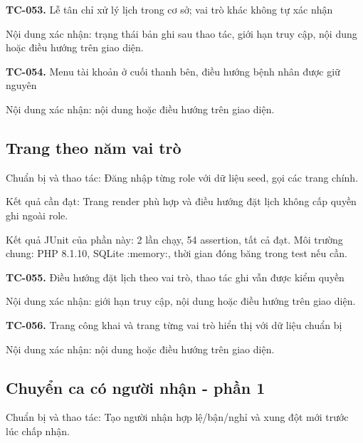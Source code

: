 \noindent\textbf{TC-053.} Lễ tân chỉ xử lý lịch trong cơ sở; vai trò khác không tự xác nhận\par
Nội dung xác nhận:\allowbreak{} trạng thái bản ghi sau thao tác, giới hạn truy cập, nội dung hoặc điều hướng trên giao diện.\allowbreak{}

\noindent\textbf{TC-054.} Menu tài khoản ở cuối thanh bên, điều hướng bệnh nhân được giữ nguyên\par
Nội dung xác nhận:\allowbreak{} nội dung hoặc điều hướng trên giao diện.\allowbreak{}


\par\vspace{8pt}

\subsection{Trang theo năm vai trò}
Chuẩn bị và thao tác:\allowbreak{} Đăng nhập từng role với dữ liệu seed, gọi các trang chính.\allowbreak{}

Kết quả cần đạt:\allowbreak{} Trang render phù hợp và điều hướng đặt lịch không cấp quyền ghi ngoài role.\allowbreak{}

Kết quả JUnit của phần này:\allowbreak{} 2 lần chạy, 54 assertion, tất cả đạt.\allowbreak{} Môi trường chung:\allowbreak{} PHP 8.\allowbreak{}1.\allowbreak{}10, SQLite :\allowbreak{}memory:\allowbreak{}, thời gian đóng băng trong test nếu cần.\allowbreak{}

\noindent\textbf{TC-055.} Điều hướng đặt lịch theo vai trò, thao tác ghi vẫn được kiểm quyền\par
Nội dung xác nhận:\allowbreak{} giới hạn truy cập, nội dung hoặc điều hướng trên giao diện.\allowbreak{}

\noindent\textbf{TC-056.} Trang công khai và trang từng vai trò hiển thị với dữ liệu chuẩn bị\par
Nội dung xác nhận:\allowbreak{} nội dung hoặc điều hướng trên giao diện.\allowbreak{}


\par\vspace{8pt}

\subsection{Chuyển ca có người nhận - phần 1}
Chuẩn bị và thao tác:\allowbreak{} Tạo người nhận hợp lệ/\allowbreak{}bận/\allowbreak{}nghỉ và xung đột mới trước lúc chấp nhận.\allowbreak{}

